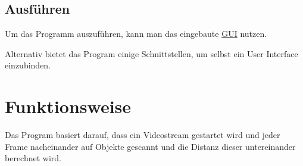 \documentclass[12pt]{article}
\theoremstyle{definition}
\begin{document}
\subsection{Ausführen}
\begin{flushleft}
Um das Programm auszuführen, kann man das eingebaute \hyperlink{t_gui}{GUI} nutzen.

Alternativ bietet das Program einige Schnittstellen, um selbst ein User Interface einzubinden.
\end{flushleft}

\newpage

\section{Funktionsweise}
\begin{flushleft}
Das Program basiert darauf, dass ein Videostream gestartet wird und jeder Frame nacheinander auf Objekte gescannt und die Distanz dieser untereinander berechnet wird.
\end{flushleft}
\end{document}
